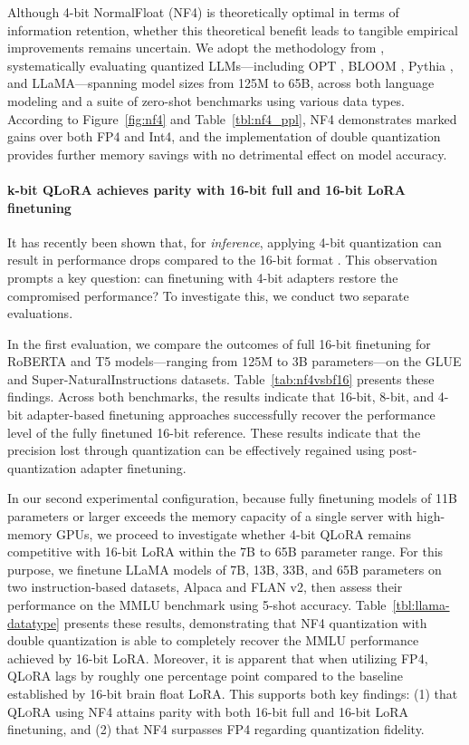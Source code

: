 Although 4-bit NormalFloat (NF4) is theoretically optimal in terms of information retention, whether this theoretical benefit leads to tangible empirical improvements remains uncertain. We adopt the methodology from \citet{dettmers2022case}, systematically evaluating quantized LLMs—including OPT \citep{zhang2022opt}, BLOOM \cite{scao2022bloom}, Pythia \cite{biderman2023pythia}, and LLaMA—spanning model sizes from 125M to 65B, across both language modeling and a suite of zero-shot benchmarks using various data types. According to Figure~\ref{fig:nf4} and Table~\ref{tbl:nf4_ppl}, NF4 demonstrates marked gains over both FP4 and Int4, and the implementation of double quantization provides further memory savings with no detrimental effect on model accuracy.

\paragraph{k-bit \textsc{QLoRA} achieves parity with 16-bit full and 16-bit LoRA finetuning} It has recently been shown that, for \emph{inference}, applying 4-bit quantization can result in performance drops compared to the 16-bit format \citep{dettmers2022case,frantar2022gptq}. This observation prompts a key question: can finetuning with 4-bit adapters restore the compromised performance? To investigate this, we conduct two separate evaluations.

In the first evaluation, we compare the outcomes of full 16-bit finetuning for RoBERTA and T5 models—ranging from 125M to 3B parameters—on the GLUE and Super-NaturalInstructions datasets. Table~\ref{tab:nf4vsbf16} presents these findings. Across both benchmarks, the results indicate that 16-bit, 8-bit, and 4-bit adapter-based finetuning approaches successfully recover the performance level of the fully finetuned 16-bit reference. These results indicate that the precision lost through quantization can be effectively regained using post-quantization adapter finetuning.

In our second experimental configuration, because fully finetuning models of 11B parameters or larger exceeds the memory capacity of a single server with high-memory GPUs, we proceed to investigate whether 4-bit \textsc{QLoRA} remains competitive with 16-bit LoRA within the 7B to 65B parameter range. For this purpose, we finetune LLaMA models of 7B, 13B, 33B, and 65B parameters on two instruction-based datasets, Alpaca and FLAN v2, then assess their performance on the MMLU benchmark using 5-shot accuracy. Table~\ref{tbl:llama-datatype} presents these results, demonstrating that NF4 quantization with double quantization is able to completely recover the MMLU performance achieved by 16-bit LoRA. Moreover, it is apparent that when utilizing FP4, \textsc{QLoRA} lags by roughly one percentage point compared to the baseline established by 16-bit brain float LoRA. This supports both key findings: (1) that \textsc{QLoRA} using NF4 attains parity with both 16-bit full and 16-bit LoRA finetuning, and (2) that NF4 surpasses FP4 regarding quantization fidelity.

